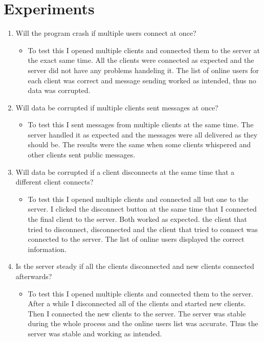 \documentclass{article}
\begin{document}
\section{Experiments}
\begin{enumerate}
	\item Will the program crash if multiple users connect at once?
	\begin{itemize}
		\item To test this I opened multiple clients and connected them to the server at the exact same time.
		All the clients were connected as expected and the server did not have any problems handeling it. The list of 
		online users for each client was correct and message sending worked as intended, thus no data was corrupted.
	\end{itemize}

	\item Will data be corrupted if multiple clients sent messages at once?
	\begin{itemize}
		\item To test this I sent messages from multiple clients at the same time. The server handled it as expected and the messages
		were all delivered as they should be. The results were the same when some clients whispered and other clients sent public 
		messages.
	\end{itemize}

	\item Will data be corrupted if a client disconnects at the same time that a different client connects?
	\begin{itemize}
		\item To test this I opened multiple clients and connected all but one to the server. I clicked the disconnect button at 
		the same time that I connected the final client to the server. Both worked as expected. the client that tried 
		to disconnect, disconnected and the client that tried to connect was connected to the server.
		The list of online users displayed the correct information.
	\end{itemize}

	\item Is the server steady if all the clients disconnected and new clients connected afterwards?
	\begin{itemize}
		\item To test this I opened multiple clients and connected them to the server. After a while I disconnected all of the clients
		and started new clients. Then I connected the new clients to the server. The server was stable during the whole process and 
		the online users list was accurate. Thus the server was stable and working as intended.
	\end{itemize}


\end{enumerate}
\end{document}
